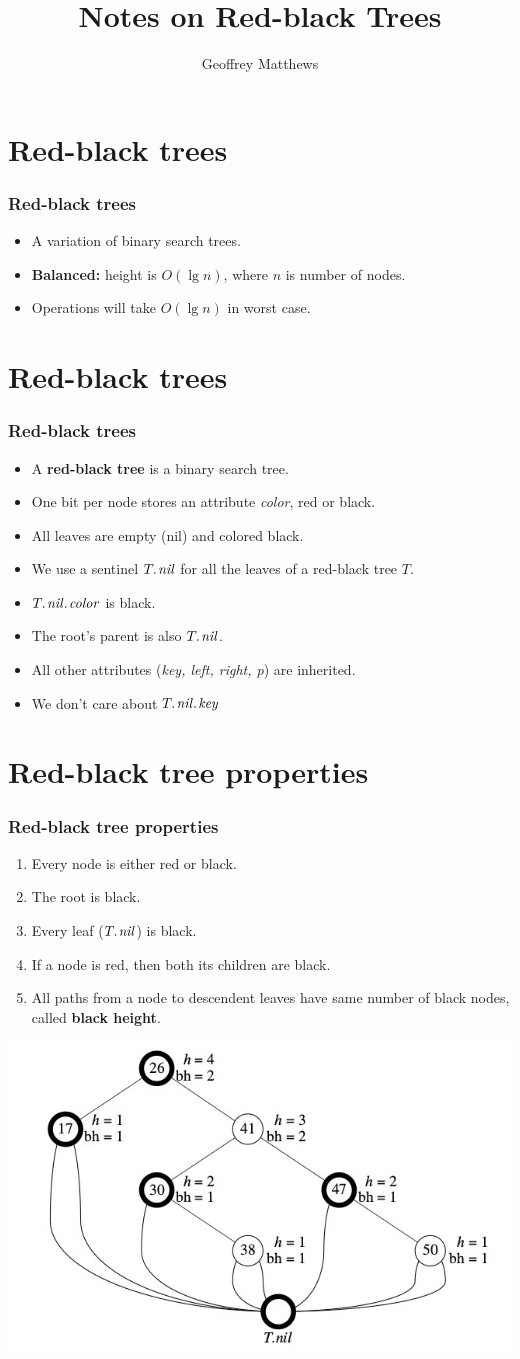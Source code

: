 \documentclass{beamer}
\title{Notes on Red-black Trees}
\author{Geoffrey Matthews}
\newcommand{\bi}{\begin{itemize}}
\newcommand{\ii}{\item}
\newcommand{\ei}{\end{itemize}}
\newcommand{\sect}[1]{
\section{#1}
\begin{frame}[fragile]\frametitle{#1}
}
\begin{document}
\begin{frame}
  \maketitle
\end{frame}


\sect{Red-black trees}
\bi
\ii A variation of binary search trees.
\ii \textbf{Balanced:} height is $O(\lg n)$, where $n$ is number of nodes.
\ii Operations will take $O(\lg n)$ in worst case.
\ei

\end{frame}

\sect{Red-black trees}
\bi
\ii A \textbf{red-black tree} is a binary search tree.
\ii One bit per node stores an attribute \textit{color}, red or black.
\ii All leaves are empty (nil) and colored black.
\ii We use a sentinel $\attrib{T}{nil}$ for all the leaves of a
red-black tree $T$.
\ii $\attrib{\attrib{T}{nil}}{color}$ is black.
\ii The root's parent is also $\attrib{T}{nil}$.
\ii All other attributes ({\em key, left, right, p}) are inherited.
\ii We don't care about $\attrib{\attrib{T}{nil}}{key}$
\ei


\end{frame}

\sect{Red-black tree properties}

\begin{enumerate}
  \ii Every node is either red or black.
  \ii The root is black.
  \ii Every leaf ($\attrib{T}{nil}$) is black.
  \ii If a node is red, then both its children are black.
  \ii All paths from a node to descendent leaves
  have same number of black nodes, called {\bf black height}.
\end{enumerate}
\vfill
\includegraphics[scale=0.5]{example}
\end{frame}
\end{document}
